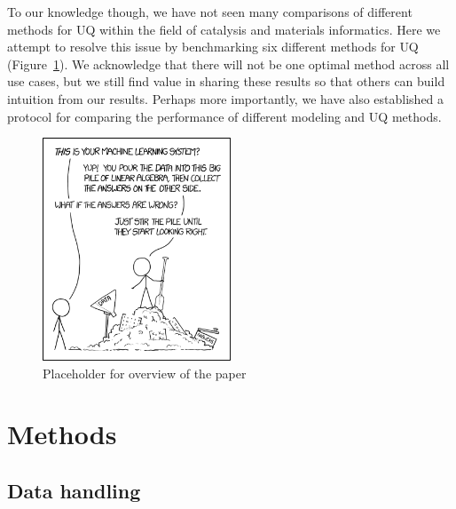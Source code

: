 \documentclass[]{achemso}
\begin{document}
To our knowledge though, we have not seen many comparisons of different methods for \gls{UQ} within the field of catalysis and materials informatics.
Here we attempt to resolve this issue by benchmarking six different methods for \gls{UQ} (Figure~\ref{fig:overview}).
We acknowledge that there will not be one optimal method across all use cases, but we still find value in sharing these results so that others can build intuition from our results.
Perhaps more importantly, we have also established a protocol for comparing the performance of different modeling and \gls{UQ} methods.

\begin{figure}
    \centering
    \includegraphics[width=0.5\textwidth]{placeholder.png}
    \caption{Placeholder for overview of the paper}\label{fig:overview}
\end{figure}



\section{Methods}

\subsection{Data handling}
\end{document}

